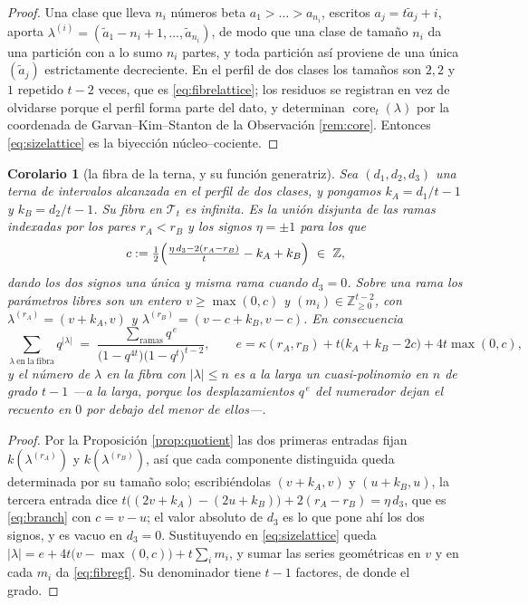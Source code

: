 \documentclass[11pt,reqno]{amsart}
\theoremstyle{plain}
\newtheorem{corollary}[theorem]{Corolario}
\theoremstyle{definition}
\newcommand{\ZZ}{\mathbb{Z}}
\newcommand{\core}{\operatorname{core}}
\begin{document}
\begin{proof}
Una clase que lleva $n_i$ números beta $a_1>\dots>a_{n_i}$, escritos $a_j=t\tilde a_j+i$, aporta
$\lambda^{(i)}=(\tilde a_1-n_i+1,\dots,\tilde a_{n_i})$, de modo que una clase de tamaño $n_i$ da
una partición con a lo sumo $n_i$ partes, y toda partición así proviene de una única
$(\tilde a_j)$ estrictamente decreciente. En el perfil de dos clases los tamaños son $2,2$ y $1$
repetido $t-2$ veces, que es \eqref{eq:fibrelattice}; los residuos se registran en vez de olvidarse
porque el perfil forma parte del dato, y determinan $\core_t(\lambda)$ por la coordenada de
Garvan--Kim--Stanton de la Observación \ref{rem:core}. Entonces \eqref{eq:sizelattice} es la
biyección núcleo--cociente.
\end{proof}

\begin{corollary}[la fibra de la terna, y su función generatriz]\label{cor:fibregf}
Sea $(d_1,d_2,d_3)$ una terna de intervalos alcanzada en el perfil de dos clases, y pongamos
$k_A=d_1/t-1$ y $k_B=d_2/t-1$. Su fibra en $\mathcal{T}_t$ es infinita. Es la unión disjunta de las
ramas indexadas por los pares $r_A<r_B$ y los signos $\eta=\pm1$ para los que
\begin{equation}\label{eq:branch}
c:=\tfrac12\Bigl(\tfrac{\eta\,d_3-2(r_A-r_B)}{t}-k_A+k_B\Bigr)\ \in\ \ZZ ,
\end{equation}
dando los dos signos una única y misma rama cuando $d_3=0$. Sobre una rama los parámetros
libres son un entero $v\ge\max(0,c)$ y $(m_i)\in\ZZ_{\ge0}^{t-2}$, con
$\lambda^{(r_A)}=(v+k_A,v)$ y $\lambda^{(r_B)}=(v-c+k_B,v-c)$. En consecuencia
\begin{equation}\label{eq:fibregf}
\sum_{\lambda\ \mathrm{en\ la\ fibra}}\!\!q^{|\lambda|}
\;=\;\frac{\sum_{\mathrm{ramas}}q^{\,e}}{\bigl(1-q^{4t}\bigr)\bigl(1-q^{t}\bigr)^{t-2}},
\qquad e=\kappa(r_A,r_B)+t\bigl(k_A+k_B-2c\bigr)+4t\max(0,c),
\end{equation}
y el número de $\lambda$ en la fibra con $|\lambda|\le n$ es a la larga un cuasi-polinomio en $n$ de
grado $t-1$ ---a la larga, porque los desplazamientos $q^{\,e}$ del numerador dejan el recuento en
$0$ por debajo del menor de ellos---.
\end{corollary}

\begin{proof}
Por la Proposición \ref{prop:quotient} las dos primeras entradas fijan $k(\lambda^{(r_A)})$ y
$k(\lambda^{(r_B)})$, así que cada componente distinguida queda determinada por su tamaño solo;
escribiéndolas $(v+k_A,v)$ y $(u+k_B,u)$, la tercera entrada dice
$t\bigl((2v+k_A)-(2u+k_B)\bigr)+2(r_A-r_B)=\eta\,d_3$, que es \eqref{eq:branch} con $c=v-u$; el
valor absoluto de $d_3$ es lo que pone ahí los dos signos, y es vacuo en $d_3=0$.
Sustituyendo en \eqref{eq:sizelattice} queda $|\lambda|=e+4t\bigl(v-\max(0,c)\bigr)+t\sum_i m_i$, y
sumar las series geométricas en $v$ y en cada $m_i$ da \eqref{eq:fibregf}. Su denominador tiene
$t-1$ factores, de donde el grado.
\end{proof}
\end{document}
